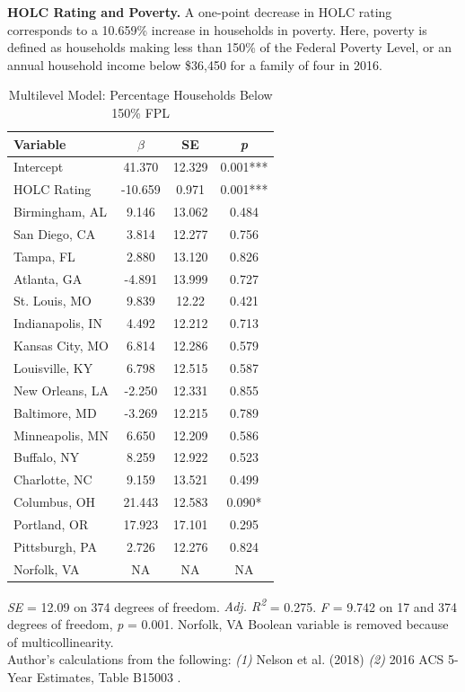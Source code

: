 \documentclass[paper=letter, fontsize=12pt]{scrartcl} %
\begin{document}
	\begin{table}
		\textbf{HOLC Rating and Poverty.} A one-point decrease in HOLC rating corresponds to a 10.659\% increase in households in poverty. Here, poverty is defined as households making less than 150\% of the Federal Poverty Level, or an annual household income below \$36,450 for a family of four in 2016.
		\caption{Multilevel Model: Percentage Households Below 150\% FPL}
		\begin{center}
			\begin{tabular}{|| l | c c c ||}
				\hline
				Variable & $\beta$ & SE & \textit{p}\\
				\hline \hline
				Intercept & 41.370 & 12.329 & 0.001***\\ 
				\hline 
				HOLC Rating & -10.659 & 0.971 & 0.001***\\ 
				\hline 
				Birmingham, AL & 9.146 & 13.062 & 0.484\\ 
				\hline 
				San Diego, CA & 3.814 & 12.277 & 0.756\\ 
				\hline 
				Tampa, FL & 2.880 & 13.120 & 0.826\\ 
				\hline 
				Atlanta, GA & -4.891 & 13.999 & 0.727\\ 
				\hline 
				St. Louis, MO & 9.839 & 12.22 & 0.421\\ 
				\hline 
				Indianapolis, IN & 4.492 & 12.212 & 0.713\\ 
				\hline 
				Kansas City, MO & 6.814 & 12.286 & 0.579\\ 
				\hline 
				Louisville, KY & 6.798 & 12.515 & 0.587\\ 
				\hline 
				New Orleans, LA & -2.250 & 12.331 & 0.855\\ 
				\hline 
				Baltimore, MD & -3.269 & 12.215 & 0.789\\ 
				\hline 
				Minneapolis, MN & 6.650 & 12.209 & 0.586\\ 
				\hline 
				Buffalo, NY & 8.259 & 12.922 & 0.523\\ 
				\hline 
				Charlotte, NC & 9.159 & 13.521 & 0.499\\ 
				\hline 
				Columbus, OH & 21.443 & 12.583 & 0.090*\\ 
				\hline 
				Portland, OR & 17.923 & 17.101 & 0.295\\ 
				\hline 
				Pittsburgh, PA & 2.726 & 12.276 & 0.824\\ 
				\hline 
				Norfolk, VA & NA & NA & NA\\ 
				\hline
			\end{tabular}
		\end{center}
		\textit{SE} = 12.09 on 374 degrees of freedom. \textit{Adj. R\textsuperscript{2}} = 0.275. \textit{F} = 9.742 on 17 and 374 degrees of freedom, \textit{p} = 0.001. Norfolk, VA Boolean variable is removed because of multicollinearity.\\
		Author's calculations from the following: \textit{(1)} Nelson et al. (2018) \cite{richmond} \textit{(2)} 2016 ACS 5-Year Estimates, Table B15003 \cite{acs16}.
	\end{table}
	
\end{document}
